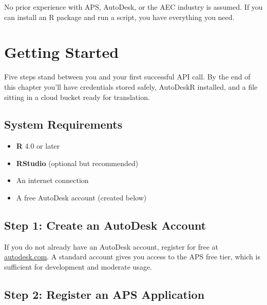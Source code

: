 \documentclass[
  11pt,
  letterpaper,
  DIV=11,
  numbers=noendperiod]{scrreprt}
\providecommand{\tightlist}{%
  \setlength{\itemsep}{0pt}\setlength{\parskip}{0pt}}
\begin{document}
No prior experience with APS, AutoDesk, or the AEC industry is assumed.
If you can install an R package and run a script, you have everything
you need.

\chapter*{Getting Started}\label{getting-started}


Five steps stand between you and your first successful API call. By the
end of this chapter you'll have credentials stored safely, AutoDeskR
installed, and a file sitting in a cloud bucket ready for translation.

\section*{System Requirements}\label{system-requirements}


\begin{itemize}
\tightlist
\item
  \textbf{R} 4.0 or later
\item
  \textbf{RStudio} (optional but recommended)
\item
  An internet connection
\item
  A free AutoDesk account (created below)
\end{itemize}

\section*{Step 1: Create an AutoDesk
Account}\label{step-1-create-an-autodesk-account}


If you do not already have an AutoDesk account, register for free at
\href{https://www.autodesk.com}{autodesk.com}. A standard account gives
you access to the APS free tier, which is sufficient for development and
moderate usage.

\section*{Step 2: Register an APS
Application}\label{step-2-register-an-aps-application}
\end{document}
